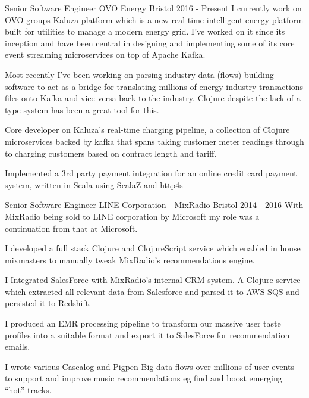 \begin{cventries}

  \cventrypara
  {Senior Software Engineer} %
  {OVO Energy} %
  {Bristol} %
  {2016  - Present} %
  {I currently work on OVO groups Kaluza platform which is a new real-time intelligent energy platform built for
  utilities to manage a modern energy grid. I've worked on it since its inception and have been central in designing
  and implementing some of its core event streaming microservices on top of Apache Kafka.}
  {
    \begin{cvitems} %
      \item {Most recently I've been working on parsing industry data (flows) building software to act as a bridge for
      translating millions of energy industry transactions files onto Kafka and vice-versa back to the industry.
      Clojure despite the lack of a type system has been a great tool for this.}
      \item {Core developer on Kaluza's real-time charging pipeline, a collection of Clojure microservices backed by
      kafka that spans taking customer meter readings through to charging customers based on contract length and tariff.}
      \item {Implemented a 3rd party payment integration for an online credit card payment system, written in Scala using
      ScalaZ and http4s}
    \end{cvitems}
  }

  \cventrypara
  {Senior Software Engineer} %
  {LINE Corporation - MixRadio} %
  {Bristol} %
  {2014  - 2016} %
  {With MixRadio being sold to LINE corporation by Microsoft my role was a continuation from that at Microsoft.}
  {
    \begin{cvitems} %
      \item {I developed a full stack Clojure and ClojureScript service which enabled in house mixmasters to manually
      tweak MixRadio's recommendations engine.}
      \item {I Integrated SalesForce with MixRadio’s internal CRM system. A Clojure service which extracted all
      relevant data from Salesforce and parsed it to AWS SQS and persisted it to Redshift.}
      \item {I produced an EMR processing pipeline to transform our massive user taste profiles into a suitable
      format and export it to SalesForce for recommendation emails.}
      \item {I wrote various Cascalog and Pigpen Big data flows over millions of user events to support and improve
      music recommendations eg find and boost emerging “hot” tracks.}
    \end{cvitems}
  }


\end{cventries}
